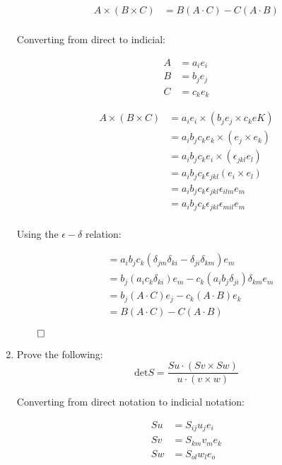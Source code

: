 \begin{problem}
\begin{enumerate}
    \begin{align*}
    A\times(B\times C)&=B(A\cdot C)-C(A\cdot B)\\[10pt]
    \end{align*}
    
    
    Converting from direct to indicial:
    
    
    \begin{align*}
    A&=a_{i}e_{i}\\[10pt]
    B&=b_{j}e_{j}\\[10pt]
    C&=c_{k}e_{k}
    \end{align*}
    
    
    \begin{align*}
    A\times(B\times C)&=a_{i}e_{i}\times(b_{j}e_{j}\times c_{k}eK)\\[10pt]
    &=a_{i}b_{j}c_{k}e_{k}\times(e_{j}\times e_{k})\\[10pt]
    &=a_{i}b_{j}c_{k}e_{i}\times(\epsilon_{jkl}e_{l})\\[10pt]
    &=a_{i}b_{j}c_{k}\epsilon_{jkl}(e_{i}\times e_{l})\\[10pt]
    &=a_{i}b_{j}c_{k}\epsilon_{jkl}\epsilon_{ilm}e_{m}\\[10pt]
    &=a_{i}b_{j}c_{k}\epsilon_{jkl}\epsilon_{mil}e_{m}\\[10pt]
    \end{align*}

    \pagebreak
    Using the $\epsilon-\delta$ relation:
    

    \begin{align*}
    &=a_{i}b_{j}c_{k}(\delta_{jm}\delta_{ki}-\delta_{ji}\delta_{km})e_{m}\\[10pt]
    &=b_{j}(a_{i}c_{k}\delta_{ki})e_{m}-c_{k}(a_{i}b_{j}\delta_{ji})\delta_{km}e_{m}\\[10pt]
    &=b_{j}(A\cdot C)e_{j}-c_{k}(A\cdot B)e_{k}\\[10pt]
    &=B(A\cdot C)-C(A\cdot B)
    \end{align*}
    
    
    $\qed$
    
    
    \item     
Prove the following:
$$
\text{det}S=\frac{Su\cdot(Sv\times Sw)}{u\cdot(v\times w)}
$$

Converting from direct notation to indicial notation:

\begin{align*}
Su&=S_{ij}u_{j}e_{i}\\[10pt]
Sv&=S_{km}v_{m}e_{k}\\[10pt]
Sw&=S_{ol}w_{l}e_{o}
\end{align*}


\end{enumerate}
\end{problem}
